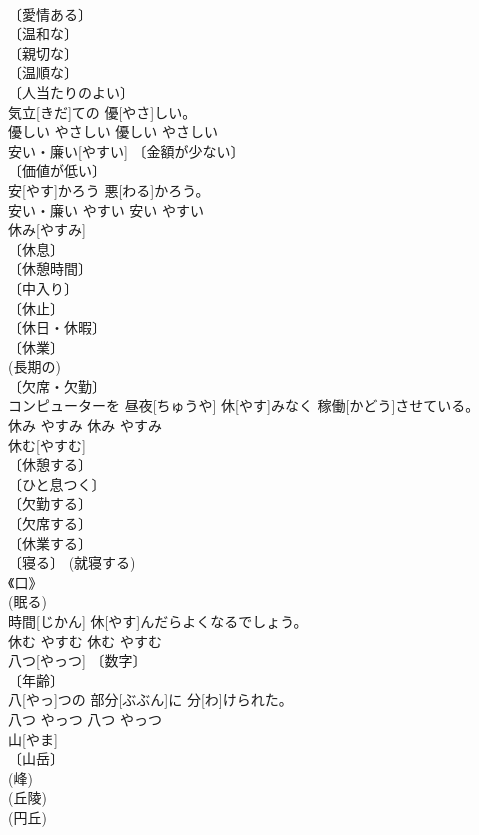 \documentclass[8pt]{extreport}
\begin{document}
\begin{CJK}{UTF8}{min}
\\	〔愛情ある〕 
\\	〔温和な〕 
\\	〔親切な〕 
\\	〔温順な〕 
\\	〔人当たりのよい〕 
\\	気立[きだ]ての 優[やさ]しい。	
\\	優しい	やさしい	優しい	やさしい	
\\	安い・廉い[やすい]	〔金額が少ない〕 
\\	〔価値が低い〕 
\\	安[やす]かろう 悪[わる]かろう。	
\\	安い・廉い	やすい	安い	やすい	
\\	休み[やすみ]	
\\	〔休息〕 
\\	〔休憩時間〕 
\\	〔中入り〕 
\\	〔休止〕 
\\	〔休日・休暇〕 
\\	〔休業〕 
\\	(長期の) 
\\	〔欠席・欠勤〕 
\\	コンピューターを 昼夜[ちゅうや] 休[やす]みなく 稼働[かどう]させている。	
\\	休み	やすみ	休み	やすみ	
\\	休む[やすむ]	
\\	〔休憩する〕 
\\	〔ひと息つく〕 
\\	〔欠勤する〕 
\\	〔欠席する〕 
\\	〔休業する〕 
\\	〔寝る〕 (就寝する) 
\\	《口》 
\\	(眠る) 
\\	時間[じかん] 休[やす]んだらよくなるでしょう。	
\\	休む	やすむ	休む	やすむ	
\\	八つ[やっつ]	〔数字〕 
\\	〔年齢〕 
\\	八[やっ]つの 部分[ぶぶん]に 分[わ]けられた。	
\\	八つ	やっつ	八つ	やっつ	
\\	山[やま]	
\\	〔山岳〕 
\\	(峰) 
\\	(丘陵) 
\\	(円丘) 

\end{CJK}
\end{document}
